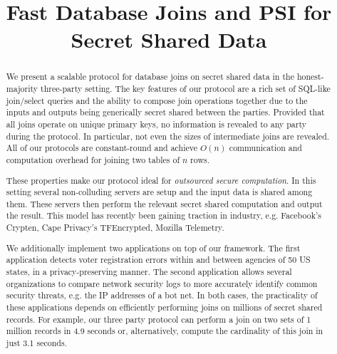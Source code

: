 \documentclass[11pt,letterpaper]{article}
\begin{document}
\title{Fast Database Joins and PSI for Secret Shared Data}
\begin{abstract}
We present a scalable protocol for database joins on secret shared data in the honest-majority three-party setting. The key features of our protocol are a rich set of SQL-like join/select queries and the ability to compose join operations together due to the inputs and outputs being generically secret shared between the parties. Provided that all joins operate on unique primary keys, no information is revealed to any party during the protocol. In particular, not even the sizes of intermediate joins are revealed. All of our protocols are constant-round and achieve $O(n)$ communication and computation overhead for joining two tables of $n$ rows. 

These properties make our protocol ideal for \emph{outsourced secure computation}. In this setting several non-colluding servers are setup and the input data is shared among them. These servers then perform the relevant secret shared computation and output the result. This model has recently been gaining traction in industry, e.g. Facebook's Crypten, Cape Privacy's TFEncrypted, Mozilla Telemetry.

We additionally implement two applications on top of our framework. The first application detects voter registration errors within and between agencies of 50 US states, in a privacy-preserving manner. The second application allows several organizations to compare network security logs to more accurately identify common security threats, e.g. the IP addresses of a bot net. In both cases, the practicality of these applications depends on efficiently performing joins on millions of secret shared records. For example, our three party protocol can perform a join on two sets of 1 million records in 4.9 seconds or, alternatively, compute the cardinality of this join in just 3.1 seconds. 
\end{abstract}

\iffullversion
\else
\maketitle
\fi






%











\appendix
\iffullversion
\else



\fi
\end{document}
